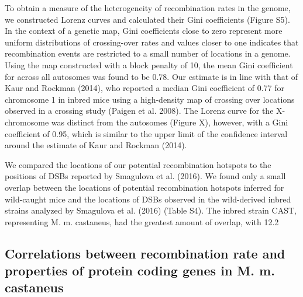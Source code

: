 	To obtain a measure of the heterogeneity of recombination rates in the genome, we constructed Lorenz curves and calculated their Gini coefficients (Figure S5). In the context of a genetic map, Gini coefficients close to zero represent more uniform distributions of crossing-over rates and values closer to one indicates that recombination events are restricted to a small number of locations in a genome. Using the map constructed with a block penalty of 10, the mean Gini coefficient for across all autosomes was found to be 0.78. Our estimate is in line with that of Kaur and Rockman (2014), who reported a median Gini coefficient of 0.77 for chromosome 1 in inbred mice using a high-density map of crossing over locations observed in a crossing study (Paigen et al. 2008). The Lorenz curve for the X-chromosome was distinct from the autosomes (Figure X), however, with a Gini coefficient of 0.95, which is similar to the upper limit of the confidence interval around the estimate of Kaur and Rockman (2014). 

We compared the locations of our potential recombination hotspots to the positions of DSBs reported by Smagulova et al. (2016). We found only a small overlap between the locations of potential recombination hotspots inferred for wild-caught mice and the locations of DSBs observed in the wild-derived inbred strains analyzed by Smagulova et al. (2016) (Table S4). The inbred strain CAST, representing M. m. castaneus, had the greatest amount of overlap, with 12.2%

\subsection{Correlations between recombination rate and properties of protein coding genes in M. m. castaneus}

